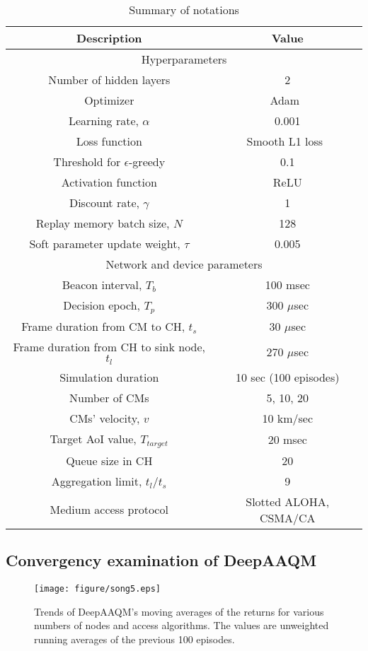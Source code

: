 \documentclass[journal]{IEEEtran}
\begin{document}
\begin{table}
\caption{Summary of notations}
\label{table}
\setlength{\tabcolsep}{3pt}
\centering
\begin{tabular}{c|c}
\hline
Description & Value \\
\hline
\hline
\multicolumn{2}{c}{Hyperparameters} \\
\hline
Number of hidden layers & 2 \\
Optimizer & Adam~\cite{adam} \\ 
Learning rate, $\alpha$ & 0.001 \\
Loss function & Smooth L1 loss~\cite{girshick2015fast} \\
Threshold for $\epsilon$-greedy & 0.1 \\
Activation function & ReLU \\
Discount rate, $\gamma$ & 1 \\
Replay memory batch size, $N$ & 128 \\
Soft parameter update weight, $\tau$ & 0.005 \\
\hline
\hline
\multicolumn{2}{c}{Network and device parameters} \\
\hline
Beacon interval, $T_{b}$ & 100 msec \\
Decision epoch, $T_{p}$ & 300 $\mu$sec \\
Frame duration from CM to CH, $t_s$ & 30 $\mu$sec \\
Frame duration from CH to sink node, $t_l$ & 270 $\mu$sec \\
Simulation duration & 10 sec (100 episodes) \\
Number of CMs & 5, 10, 20 \\
CMs' velocity, $v$ & 10 km/sec \\
Target AoI value, $T_{target}$ & 20 msec \\
Queue size in CH & 20 \\
Aggregation limit, $t_l/t_s$ & 9 \\
Medium access protocol & Slotted ALOHA, CSMA/CA \\
\hline
\end{tabular}
\label{tab:parameter}
\end{table}

\subsection{Convergency examination of DeepAAQM}
\label{subsec:conv}

\begin{figure}
\centering
\texttt{[image: figure/song5.eps]}
\caption{Trends of DeepAAQM’s moving averages of the returns for various numbers of nodes and access algorithms. The values are unweighted running averages of the previous 100 episodes.}
\label{fig:return}
\end{figure}
\end{document}
